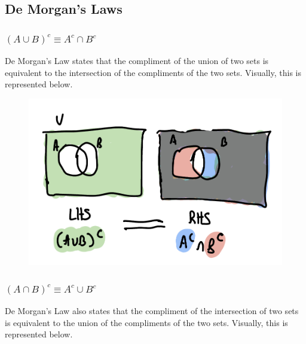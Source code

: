 \documentclass{article}
\begin{document}
\subsection{De Morgan's Laws}

\subsubsection{$\left(A \cup B\right)^c \equiv A^c \cap B^c $}

De Morgan's Law states that the compliment of the union of two sets is equivalent to the intersection of the compliments of the two sets. Visually, this is represented below.

\begin{figure}[!htb]
    \centering
    \includegraphics[scale=0.125]{./demorgans-1.jpeg}
    \label{fig:demorgans-1}
\end{figure}

\subsubsection{$\left(A \cap B\right)^c \equiv A^c \cup B^c $}

De Morgan's Law also states that the compliment of the intersection of two sets is equivalent to the union of the compliments of the two sets. Visually, this is represented below.
\end{document}
